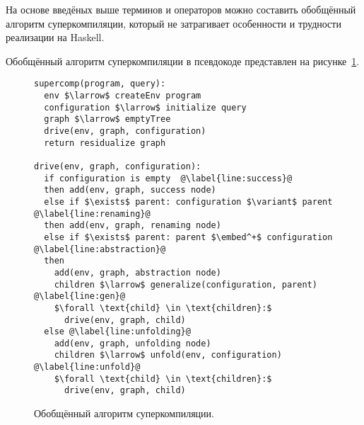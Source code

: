 
На основе введёных выше терминов и операторов можно составить обобщённый алгоритм
суперкомпиляции, который не затрагивает особенности и трудности реализации на Haskell.

%
% 

Обобщённый алгоритм суперкомпиляции в псевдокоде представлен на рисунке~\ref{fig:scalgogen}.

\begin{figure}[h!]

\begin{lstlisting}[escapechar=@]
supercomp(program, query):
  env $\larrow$ createEnv program
  configuration $\larrow$ initialize query
  graph $\larrow$ emptyTree
  drive(env, graph, configuration)
  return residualize graph

drive(env, graph, configuration):
  if configuration is empty  @\label{line:success}@
  then add(env, graph, success node)
  else if $\exists$ parent: configuration $\variant$ parent @\label{line:renaming}@
  then add(env, graph, renaming node)
  else if $\exists$ parent: parent $\embed^+$ configuration @\label{line:abstraction}@
  then
    add(env, graph, abstraction node)
    children $\larrow$ generalize(configuration, parent) @\label{line:gen}@
    $\forall \text{child} \in \text{children}:$
      drive(env, graph, child)
  else @\label{line:unfolding}@
    add(env, graph, unfolding node)
    children $\larrow$ unfold(env, configuration) @\label{line:unfold}@
    $\forall \text{child} \in \text{children}:$
      drive(env, graph, child)
\end{lstlisting}
\caption{Обобщённый алгоритм суперкомпиляции.}
\label{fig:scalgogen}
\end{figure}

